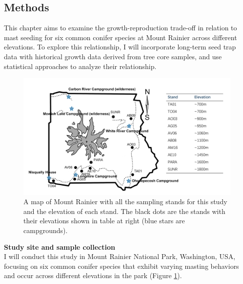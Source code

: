 \documentclass[11pt,letter]{article}
\begin{document}
\subsection{Methods}
This chapter aims to examine the growth-reproduction trade-off in relation to mast seeding for six common conifer species at Mount Rainier across different elevations. To explore this relationship, I will incorporate long-term seed trap data with historical growth data derived from tree core samples, and use statistical approaches to analyze their relationship.
\begin{figure}[H]
	\centering
	\includegraphics[width=1\linewidth]{rainierMap.png}
	\caption{A map of Mount Rainier with all the sampling stands for this study and the elevation of each stand. The black dots are the stands with their elevations shown in table at right (blue stars are campgrounds).}
	\label{fig:sites}
\end{figure}
\textbf{Study site and sample collection}\\
I will conduct this study in Mount Rainier National Park, Washington, USA, focusing on six common conifer species that exhibit varying masting behaviors and occur across different elevations in the park (Figure \ref{fig:sites}).
\end{document}

